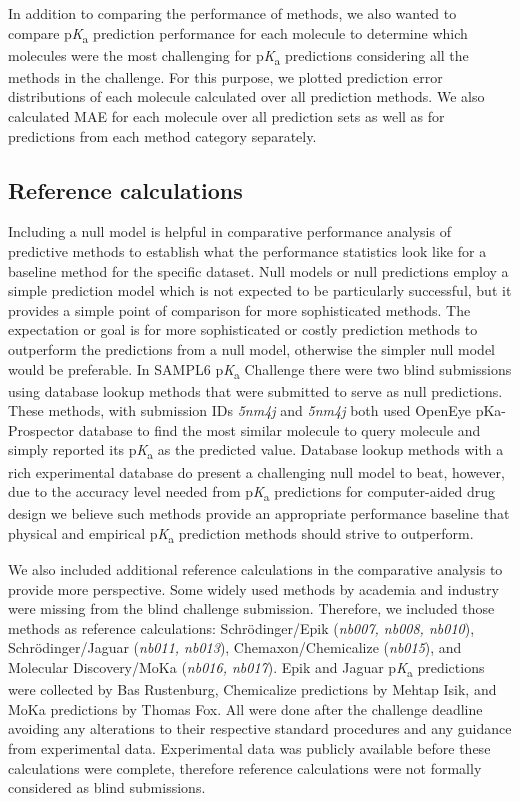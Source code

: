 \documentclass[9pt,lineno,final]{elife}
\newcommand{\pKa}{p\textit{K}\textsubscript{a}}
\begin{document}
In addition to comparing the performance of methods, we also wanted to compare \pKa{} prediction performance for each molecule to determine which molecules were the most challenging for \pKa{} predictions considering all the methods in the challenge. 
For this purpose, we plotted prediction error distributions of each molecule calculated over all prediction methods. 
We also calculated MAE for each molecule over all prediction sets as well as for predictions from each method category separately. 


\subsection{Reference calculations}

Including a null model is helpful in comparative performance analysis of predictive methods to establish what the performance statistics look like for a baseline method for the specific dataset. 
Null models or null predictions employ a simple prediction model which is not expected to be particularly successful, but it provides a simple point of comparison for more sophisticated methods. 
The expectation or goal is for more sophisticated or costly prediction methods to outperform the predictions from a null model, otherwise the simpler null model would be preferable. 
In SAMPL6 \pKa{} Challenge there were two blind submissions using database lookup methods that were submitted to serve as null predictions. These methods, with submission IDs \textit{5nm4j} and \textit{5nm4j} both used OpenEye pKa-Prospector database to find the most similar molecule to query molecule and simply reported its \pKa{} as the predicted value. 
Database lookup methods with a rich experimental database do present a challenging null model to beat, however, due to the accuracy level needed from \pKa{} predictions for computer-aided drug design we believe such methods provide an appropriate performance baseline that physical and empirical \pKa{} prediction methods should strive to outperform.

We also included additional reference calculations in the comparative analysis to provide more perspective. 
Some widely used methods by academia and industry were missing from the blind challenge submission. Therefore, we included those methods as reference calculations: Schr\"{o}dinger/Epik (\textit{nb007, nb008, nb010}), Schr\"{o}dinger/Jaguar (\textit{nb011, nb013}), Chemaxon/Chemicalize (\textit{nb015}), and Molecular Discovery/MoKa (\textit{nb016, nb017}). 
Epik and Jaguar \pKa{} predictions were collected by Bas Rustenburg, Chemicalize predictions by Mehtap Isik, and MoKa predictions by Thomas Fox. 
All were done after the challenge deadline avoiding any alterations to their respective standard procedures and any guidance from experimental data. 
Experimental data was publicly available before these calculations were complete, therefore reference calculations were not formally considered as blind submissions. 
\end{document}
